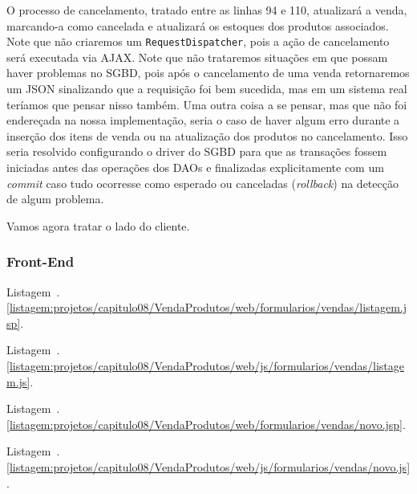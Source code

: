 O processo de cancelamento, tratado entre as linhas 94 e 110, atualizará a venda, marcando-a como cancelada e atualizará os estoques dos produtos associados. Note que não criaremos um \texttt{RequestDispatcher}, pois a ação de cancelamento será executada via AJAX. Note que não trataremos situações em que possam haver problemas no SGBD, pois após o cancelamento de uma venda retornaremos um JSON sinalizando que a requisição foi bem sucedida, mas em um sistema real teríamos que pensar nisso também. Uma outra coisa a se pensar, mas que não foi endereçada na nossa implementação, seria o caso de haver algum erro durante a inserção dos itens de venda ou na atualização dos produtos no cancelamento. Isso seria resolvido configurando o driver do SGBD para que as transações fossem iniciadas antes das operações dos DAOs e finalizadas explicitamente com um \textit{commit} caso tudo ocorresse como esperado ou canceladas (\textit{rollback}) na detecção de algum problema.

Vamos agora tratar o lado do cliente.

\subsubsection{Front-End}




Listagem~\thechapter.\ref{listagem:projetos/capitulo08/VendaProdutos/web/formularios/vendas/listagem.jsp}.



Listagem~\thechapter.\ref{listagem:projetos/capitulo08/VendaProdutos/web/js/formularios/vendas/listagem.js}.



Listagem~\thechapter.\ref{listagem:projetos/capitulo08/VendaProdutos/web/formularios/vendas/novo.jsp}.



Listagem~\thechapter.\ref{listagem:projetos/capitulo08/VendaProdutos/web/js/formularios/vendas/novo.js}.

